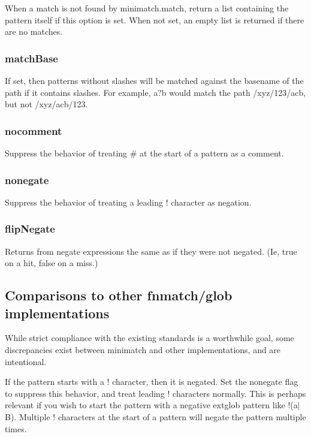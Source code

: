 When a match is not found by {\ttfamily minimatch.\+match}, return a list containing the pattern itself if this option is set. When not set, an empty list is returned if there are no matches.

\subsubsection*{match\+Base}

If set, then patterns without slashes will be matched against the basename of the path if it contains slashes. For example, {\ttfamily a?b} would match the path {\ttfamily /xyz/123/acb}, but not {\ttfamily /xyz/acb/123}.

\subsubsection*{nocomment}

Suppress the behavior of treating {\ttfamily \#} at the start of a pattern as a comment.

\subsubsection*{nonegate}

Suppress the behavior of treating a leading {\ttfamily !} character as negation.

\subsubsection*{flip\+Negate}

Returns from negate expressions the same as if they were not negated. (Ie, true on a hit, false on a miss.)

\subsection*{Comparisons to other fnmatch/glob implementations}

While strict compliance with the existing standards is a worthwhile goal, some discrepancies exist between minimatch and other implementations, and are intentional.

If the pattern starts with a {\ttfamily !} character, then it is negated. Set the {\ttfamily nonegate} flag to suppress this behavior, and treat leading {\ttfamily !} characters normally. This is perhaps relevant if you wish to start the pattern with a negative extglob pattern like {\ttfamily !(a$\vert$\+B)}. Multiple {\ttfamily !} characters at the start of a pattern will negate the pattern multiple times.

